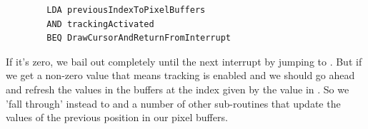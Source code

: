 \begin{lstlisting}
        LDA previousIndexToPixelBuffers
        AND trackingActivated
        BEQ DrawCursorAndReturnFromInterrupt
\end{lstlisting}

If it's zero, we bail out
completely until the next interrupt by jumping to .
But if we get a non-zero value that means tracking is enabled and 
we should go ahead and refresh the values in the buffers at the index given
by the value in . So we 'fall through' instead to
 and a number of other sub-routines that update the
values of the previous position in our pixel buffers.

\clearpage
